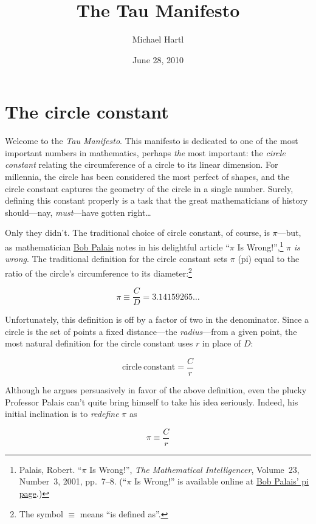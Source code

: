 \documentclass{article}
\begin{document}
\title{The Tau Manifesto}
\author{Michael Hartl}
\date{June 28, 2010}
\maketitle

\section{The circle constant} %
\label{sec:the_circle_constant}

Welcome to the \emph{Tau Manifesto}. This manifesto is dedicated to one of the most important numbers in mathematics, perhaps \emph{the} most important: the \emph{circle constant} relating the circumference of a circle to its linear dimension. For millennia, the circle has been considered the most perfect of shapes, and the circle constant captures the geometry of the circle in a single number. Surely, defining this constant properly is a task that the great mathematicians of history should---nay, \emph{must}---have gotten right\ldots

Only they didn't. The traditional choice of circle constant, of course, is $\pi$---but, as mathematician \href{http://www.math.utah.edu/~palais/}{Bob Palais} notes in his delightful article ``$\pi$ Is Wrong!'',\footnote{Palais, Robert. ``$\pi$ Is Wrong!'', \emph{The Mathematical Intelligencer}, Volume~23, Number~3, 2001, pp.~7--8. (``$\pi$ Is Wrong!'' is available online at \href{http://www.math.utah.edu/~palais/pi.html}{Bob Palais' pi page}.)} $\pi$ \emph{is wrong}. The traditional definition for the circle constant sets $\pi$ (pi) equal to the ratio of the circle's circumference to its diameter:\footnote{The symbol $\equiv$ means ``is defined as''.}


\[
  \pi \equiv \frac{C}{D} = 3.14159265\ldots
\]

\noindent Unfortunately, this definition is off by a factor of two in the denominator. Since a circle is the set of points a fixed distance---the \emph{radius}---from a given point, the most natural definition for the circle constant uses $r$ in place of $D$:

\[
  \mathrm{circle\ constant} = \frac{C}{r}
\]

Although he argues persuasively in favor of the above definition, even the plucky Professor Palais can't quite bring himself to take his idea seriously. Indeed, his initial inclination is to \emph{redefine} $\pi$ as

\[
  \pi \equiv \frac{C}{r}
\]
\end{document}
